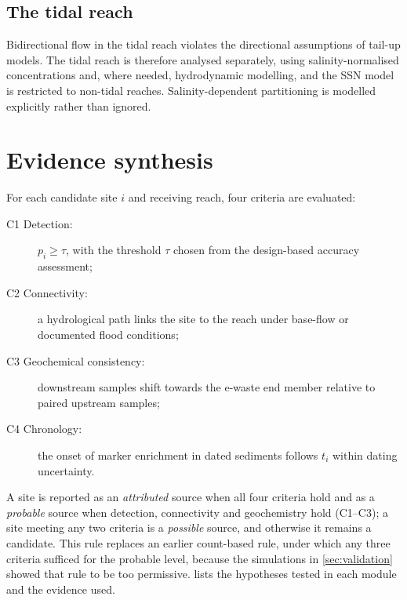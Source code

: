 \documentclass[10pt]{article}
\begin{document}
\subsection{The tidal reach}
Bidirectional flow in the tidal reach violates the directional assumptions of tail-up models. The tidal reach is therefore analysed separately, using salinity-normalised concentrations and, where needed, hydrodynamic modelling, and the SSN model is restricted to non-tidal reaches. Salinity-dependent partitioning \citep{dulaing2009} is modelled explicitly rather than ignored.

\section{Evidence synthesis}\label{sec:synthesis}
For each candidate site $i$ and receiving reach, four criteria are evaluated:
\begin{description}
\item[C1 Detection:] $p_i\ge\tau$, with the threshold $\tau$ chosen from the design-based accuracy assessment;
\item[C2 Connectivity:] a hydrological path links the site to the reach under base-flow or documented flood conditions;
\item[C3 Geochemical consistency:] downstream samples shift towards the e-waste end member relative to paired upstream samples;
\item[C4 Chronology:] the onset of marker enrichment in dated sediments follows $t_i$ within dating uncertainty.
\end{description}
A site is reported as an \emph{attributed} source when all four criteria hold and as a \emph{probable} source when detection, connectivity and geochemistry hold (C1--C3); a site meeting any two criteria is a \emph{possible} source, and otherwise it remains a candidate. This rule replaces an earlier count-based rule, under which any three criteria sufficed for the probable level, because the simulations in \cref{sec:validation} showed that rule to be too permissive.  lists the hypotheses tested in each module and the evidence used.
\end{document}
